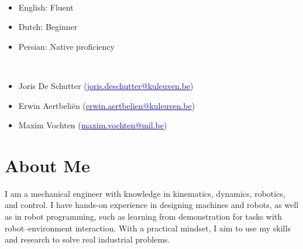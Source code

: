 \documentclass[lighthipster]{simplehipstercv}
\begin{document}
\begin{paracol}{2}
{			\bigskip		
			\bigskip
			\bigskip
			\bigskip

			\\[0.5em]
			\begin{itemize}[leftmargin=1em, itemsep=0pt, topsep=0pt]
				\item English: Fluent
				\item Dutch: Beginner
				\item Persian: Native proficiency
			\end{itemize}
			
			\bigskip
			\bigskip
			\bigskip
			\bigskip
			
			\\[0.5em]
			\begin{itemize}[leftmargin=1em, itemsep=0pt, topsep=0pt]
				\item Joris De Schutter (\href{mailto:joris.deschutter@kuleuven.be}{\textcolor{blue}{joris.deschutter@kuleuven.be}})
				\item Erwin Aertbeli\"en (\href{mailto:erwin.aertbelien@kuleuven.be}{\textcolor{blue}{erwin.aertbelien@kuleuven.be}})
				\item Maxim Vochten (\href{mailto:maxim.vochten@mil.be}{\textcolor{blue}{maxim.vochten@mil.be}})
			\end{itemize}
			\vspace{0em} %
			
			
		}
		\switchcolumn
		
		\small
		
		\section*{About Me}
		\large I am a mechanical engineer with knowledge in kinematics, dynamics, robotics, and control. I have hands-on experience in designing machines and robots, as well as in robot programming, such as learning from demonstration for tasks with robot–environment interaction. With a practical mindset, I aim to use my skills and research to solve real industrial problems. \vspace{-0.3cm}


\end{paracol}
\end{document}
